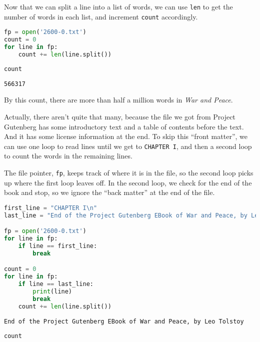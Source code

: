 Now that we can split a line into a list of words, we can use
\passthrough{\lstinline!len!} to get the number of words in each list,
and increment \passthrough{\lstinline!count!} accordingly.

\begin{lstlisting}[language=Python,style=source]
fp = open('2600-0.txt')
count = 0
for line in fp:
    count += len(line.split())
\end{lstlisting}

\begin{lstlisting}[language=Python,style=source]
count
\end{lstlisting}

\begin{lstlisting}[style=output]
566317
\end{lstlisting}

By this count, there are more than half a million words in \emph{War and
Peace}.

Actually, there aren't quite that many, because the file we got from
Project Gutenberg has some introductory text and a table of contents
before the text. And it has some license information at the end. To skip
this ``front matter'', we can use one loop to read lines until we get to
\passthrough{\lstinline!CHAPTER I!}, and then a second loop to count the
words in the remaining lines.

The file pointer, \passthrough{\lstinline!fp!}, keeps track of where it
is in the file, so the second loop picks up where the first loop leaves
off. In the second loop, we check for the end of the book and stop, so
we ignore the ``back matter'' at the end of the file.

\begin{lstlisting}[language=Python,style=source]
first_line = "CHAPTER I\n"
last_line = "End of the Project Gutenberg EBook of War and Peace, by Leo Tolstoy\n"

fp = open('2600-0.txt')
for line in fp:
    if line == first_line:
        break

count = 0
for line in fp:
    if line == last_line:
        print(line)
        break
    count += len(line.split())
\end{lstlisting}

\begin{lstlisting}[style=output]
End of the Project Gutenberg EBook of War and Peace, by Leo Tolstoy
\end{lstlisting}

\begin{lstlisting}[language=Python,style=source]
count
\end{lstlisting}


